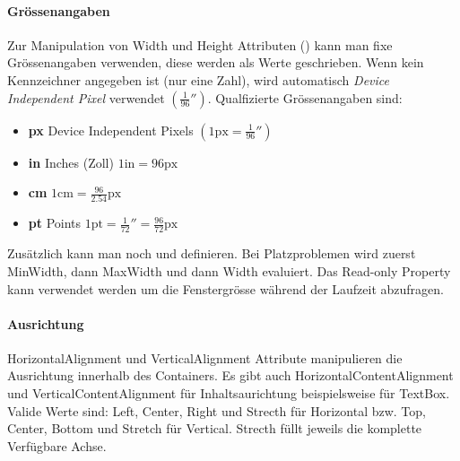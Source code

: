 \paragraph{Grössenangaben} Zur Manipulation von Width und Height Attributen () kann man fixe Grössenangaben verwenden, diese werden als  Werte geschrieben. Wenn kein Kennzeichner angegeben ist (nur eine Zahl), wird automatisch \textit{Device Independent Pixel} verwendet $\left(\frac{1}{96}''\right)$. Qualfizierte Grössenangaben sind:
\begin{itemize}
\item \textbf{px} Device Independent Pixels $\left(1\text{px} = \frac{1}{96}''\right)$
\item \textbf{in} Inches (Zoll) $1\text{in} = 96\text{px}$
\item \textbf{cm} $1\text{cm} = \frac{96}{2.54}\text{px}$
\item \textbf{pt} Points $1\text{pt} = \frac{1}{72}'' = \frac{96}{72}\text{px}$
\end{itemize}
Zusätzlich kann man noch  und  definieren. Bei Platzproblemen wird zuerst MinWidth, dann MaxWidth und dann Width evaluiert. Das Read-only Property  kann verwendet werden um die Fenstergrösse während der Laufzeit abzufragen. 
\paragraph{Ausrichtung} HorizontalAlignment und VerticalAlignment Attribute manipulieren die Ausrichtung innerhalb des Containers. Es gibt auch HorizontalContentAlignment und VerticalContentAlignment für Inhaltsaurichtung beispielsweise für TextBox. Valide Werte sind: Left, Center, Right und Strecth für Horizontal bzw. Top, Center, Bottom und Stretch für Vertical. Strecth füllt jeweils die komplette Verfügbare Achse. 
